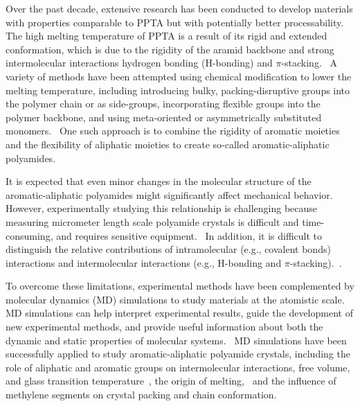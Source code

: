 \documentclass[journal=langd5,manuscript=article]{achemso}
\begin{document}
Over the past decade, extensive research has been conducted to develop materials with properties comparable to PPTA but with potentially better processability.
The high melting temperature of PPTA is a result of its rigid and extended conformation, which is due to the rigidity of the aramid backbone and strong intermolecular interactions \textemdash hydrogen bonding (H-bonding) and $\pi$-stacking.~\cite{rutledge1991analysis,deshmukh2016conformational, crouch2017fibres,brown1977thermal,tonelli2020poly}
A variety of methods have been attempted using chemical modification to lower the melting temperature, including introducing bulky, packing-disruptive groups into the polymer chain or as side-groups, incorporating flexible groups into the polymer backbone, and using meta-oriented or asymmetrically substituted monomers.~\cite{khademinejad2016poly,liou2007synthesis,amininasab2016preparation,hajibeygi2016new,zou2016synthesis,zhang2016effects,damaceanu2011organosoluble,long2020tuning}
One such approach is to combine the rigidity of aromatic moieties and the flexibility of aliphatic moieties to create so-called aromatic-aliphatic polyamides.~\cite{deshmukh2016conformational,peng2018novel,bakkali2018synthesis,rwei2018synthesis,rwei2018synthesisof,bisoi2017aromatic,morgan1975polymides}

It is expected that even minor changes in the molecular structure of the aromatic-aliphatic polyamides might significantly affect mechanical behavior.
However, experimentally studying this relationship is challenging because measuring micrometer length scale polyamide crystals is difficult and time-consuming, and requires sensitive equipment.~\cite{prevorsek1994analysis,cline2018assessment,sockalingam2017recent}
In addition, it is difficult to distinguish the relative contributions of intramolecular (e.g., covalent bonds) interactions and intermolecular interactions (e.g., H-bonding and $\pi$-stacking).~\cite{tashiro1977elastic}.

To overcome these limitations, experimental methods have been complemented by molecular dynamics (MD) simulations to study materials at the atomistic scale.~\cite{sockalingam2017recent}
MD simulations can help interpret experimental results, guide the development of new experimental methods, and provide useful information about both the dynamic and static properties of molecular systems.~\cite{moe1995molecular,zhang2016mesodyn,zhelavskyi2019atomistic}
MD simulations have been successfully applied to study aromatic-aliphatic polyamide crystals, including the role of aliphatic and aromatic groups on intermolecular interactions, free volume, and glass transition temperature~\cite{chantawansri2015investigating,long2020tuning}, the origin of melting,~\cite{deshmukh2016conformational} and the influence of methylene segments on crystal packing and chain conformation.~\cite{deshmukh2016conformational}
\end{document}
